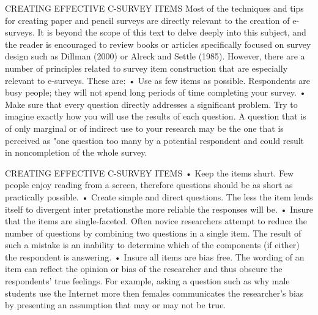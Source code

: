 \documentclass{beamer}
\begin{document}
\begin{frame}{CREATING EFFECTIVE C-SURVEY ITEMS}
Most of the techniques and tips for creating paper and pencil surveys are directly relevant to the creation of e-surveys. It is beyond the scope of this text to delve deeply into this subject, and the reader is encouraged to review books or articles specifically focused on survey design such as Dillman (2000) or Alreck and Settle (1985). 
However, there are a number of principles related to survey item construction that are especially relevant to e-surveys. These are: 
• Use as few items as possible. Respondents are busy people; they will not spend long periods of time completing your survey. 
• Make sure that every question directly addresses a significant problem. Try to imagine exactly 
how you will use the results of each question. A question that is of only marginal or of indirect use to your research may be the one that is perceived as "one question too many by a potential respondent and could result in noncompletion of the whole survey. 

\end{frame}	

\begin{frame}{CREATING EFFECTIVE C-SURVEY ITEMS}
• Keep the items shurt. Few people enjoy reading from a screen, therefore questions should be as short as practically possible. 
• Create simple and direct questions. The less the item lends itself to 
divergent inter pretationsthe more reliable the responses will be. 
• Insure that the items are single-faceted. Often novice researchers attempt to reduce the number of questions by combining two questions in a single item. The result of such a mistake is an inability to determine which of the components (if either) the respondent is answering. 
• Insure all items are bias free. The wording of an item can reflect the opinion or bias of the researcher and thus obscure the respondents' true feelings. For example, asking a question such as why male students use the Internet more then females communicates the researcher's bias by presenting an assumption that may or may not be true. 
 
\end{frame}
\end{document}

